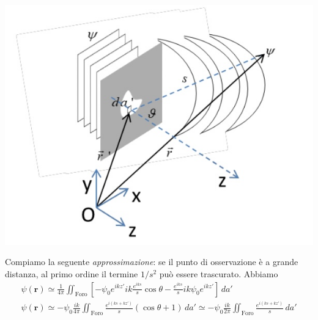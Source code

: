\begin{marginfigure}
	\includegraphics[width = 1.25 \textwidth, height = 1.25 \textheight]{figs/kirchhoff-diffraction-2}
	\label{fig:kirchhoff2}
\end{marginfigure}

Compiamo la seguente \emph{approssimazione}: se il punto di osservazione
è a grande distanza, al primo ordine il termine \(1/s^2\) può essere
trascurato. Abbiamo
\begin{gather*}
	\psi(\bm{r}) \simeq \frac{1}{4 \pi} \iint_{\text{Foro}} \left[-\psi_0 e^{ikz'} ik\frac{e^{iks}}{s} \cos \theta - \frac{e^{iks}}{s}ik\psi_0 e^{ikz'} \right]\, da'\\
	\psi(\bm{r}) \simeq -\psi_0 \frac{ik}{4 \pi} \iint_{\text{Foro}} \frac{e^{i(ks+kz')}}{s}(\cos \theta + 1)\, da' \simeq -\psi_0 \frac{ik}{2 \pi} \iint_{\text{Foro}} \frac{e^{i(ks+kz')}}{s}\,da'\\
\end{gather*}



